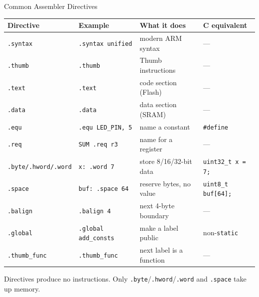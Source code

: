 \documentclass[9pt,aspectratio=169,xcolor=table]{beamer}
\begin{document}
{\beamerextras
\begin{frame}{Common Assembler Directives}
    \begin{center}
    {\footnotesize
    \striped
    \begin{tabular}{@{}l l l l@{}}
        \toprule
        \textbf{Directive} & \textbf{Example} & \textbf{What it does} & \textbf{C equivalent} \\
        \midrule
        \texttt{.syntax}  & \texttt{.syntax unified}     & modern ARM syntax          & --- \\
        \texttt{.thumb}   & \texttt{.thumb}              & Thumb instructions         & --- \\
        \texttt{.text}    & \texttt{.text}               & code section (Flash)       & --- \\
        \texttt{.data}    & \texttt{.data}               & data section (SRAM)        & --- \\
        \texttt{.equ}     & \texttt{.equ LED\_PIN, 5}    & name a constant            & \texttt{\#define} \\
        \texttt{.req}     & \texttt{SUM .req r3}         & name for a register        & --- \\
        \texttt{.byte/.hword/.word} & \texttt{x: .word 7} & store 8/16/32-bit data    & \texttt{uint32\_t x = 7;} \\
        \texttt{.space}   & \texttt{buf: .space 64}      & reserve bytes, no value    & \texttt{uint8\_t buf[64];} \\
        \texttt{.balign}  & \texttt{.balign 4}           & next 4-byte boundary       & --- \\
        \texttt{.global}  & \texttt{.global add\_consts} & make a label public        & non-\texttt{static} \\
        \texttt{.thumb\_func} & \texttt{.thumb\_func}    & next label is a function   & --- \\
        \bottomrule
    \end{tabular}}
    \end{center}

    \vspace{2mm}
    {\small Directives produce no instructions. Only \texttt{.byte}/\texttt{.hword}/\texttt{.word} and \texttt{.space} take up memory.}
\end{frame}
}
\end{document}
